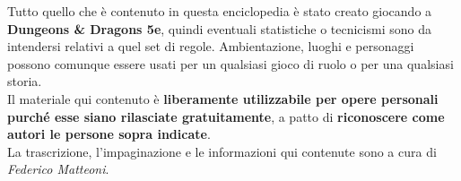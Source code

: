 \documentclass[10pt,twoside,onecolumn,openany]{book}
\begin{document}
Tutto quello che è contenuto in questa enciclopedia è stato creato giocando a \textbf{Dungeons \& Dragons 5e}, quindi eventuali statistiche o tecnicismi sono da intendersi relativi a quel set di regole. Ambientazione, luoghi e personaggi possono comunque essere usati per un qualsiasi gioco di ruolo o per una qualsiasi storia.\\
Il materiale qui contenuto è \textbf{liberamente utilizzabile per opere personali purché esse siano rilasciate gratuitamente}, a patto di \textbf{riconoscere come autori le persone sopra indicate}.\\
La trascrizione, l'impaginazione e le informazioni qui contenute sono a cura di \textit{Federico Matteoni}.\\
\newpage
\begin{multicols}{2}
\tableofcontents
\end{multicols}
\pagebreak
\end{document}

